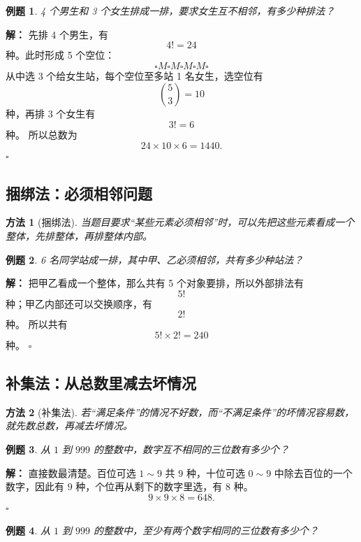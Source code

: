 \documentclass[11pt,a4paper,fontset=fandol]{ctexart}
\theoremstyle{formaltheorem}
\newtheorem{method}{方法}[section]
\theoremstyle{formalexample}
\newtheorem{example}{例题}[section]
\newenvironment{solution}{\par\noindent\textbf{解：}}{\hfill$\square$\par}
\begin{document}
\begin{example}
4 个男生和 3 个女生排成一排，要求女生互不相邻，有多少种排法？
\end{example}

\begin{solution}
先排 4 个男生，有
\[
4!=24
\]
种。此时形成 5 个空位：
\[
\square M \square M \square M \square M \square
\]
从中选 3 个给女生站，每个空位至多站 1 名女生，选空位有
\[
\binom{5}{3}=10
\]
种，再排 3 个女生有
\[
3!=6
\]
种。
所以总数为
\[
24\times 10\times 6=1440.
\]
\end{solution}

\subsection{捆绑法：必须相邻问题}
\begin{method}[捆绑法]
当题目要求“某些元素必须相邻”时，可以先把这些元素看成一个整体，先排整体，再排整体内部。
\end{method}

\begin{example}
6 名同学站成一排，其中甲、乙必须相邻，共有多少种站法？
\end{example}

\begin{solution}
把甲乙看成一个整体，那么共有 5 个对象要排，所以外部排法有
\[
5!
\]
种；甲乙内部还可以交换顺序，有
\[
2!
\]
种。
所以共有
\[
5!\times 2!=240
\]
种。
\end{solution}

\subsection{补集法：从总数里减去坏情况}
\begin{method}[补集法]
若“满足条件”的情况不好数，而“不满足条件”的坏情况容易数，就先数总数，再减去坏情况。
\end{method}

\begin{example}
从 $1$ 到 $999$ 的整数中，数字互不相同的三位数有多少个？
\end{example}

\begin{solution}
直接数最清楚。百位可选 $1\sim 9$ 共 $9$ 种，十位可选 $0\sim 9$ 中除去百位的一个数字，因此有 $9$ 种，个位再从剩下的数字里选，有 $8$ 种。
\[
9\times 9\times 8=648.
\]
\end{solution}

\begin{example}
从 $1$ 到 $999$ 的整数中，至少有两个数字相同的三位数有多少个？
\end{example}
\end{document}
